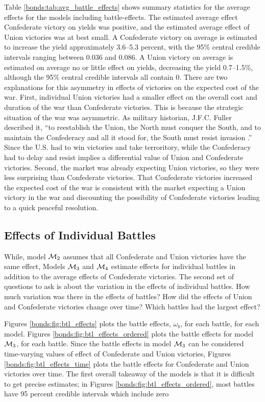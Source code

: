 Table \ref{bonds:tab:avg_battle_effects} shows summary statistics for the average effects for the models including battle-effects.
The estimated average effect Confederate victory on yields was positive, and the estimated average effect of Union victories was at best small.
A Confederate victory on average is estimated to increase the yield approximately 3.6--5.3 percent, with the 95\% central credible intervals ranging between 0.036 and 0.086.
A Union victory on average is estimated on average no or little effect on yields, decreasing the yield 0.7--1.5\%, although the 95\% central credible intervals all contain 0.
There are two explanations for this asymmetry in effects of victories on the expected cost of the war.
First, individual Union victories had a smaller effect on the overall cost and duration of the war than Confederate victories.
This is because the strategic situation of the war was asymmetric. 
As military historian, J.F.C. Fuller described it, ``to reestablish the Union, the North must conquer the South, and to maintain the Confederacy and all it stood for, the South must resist invasion \parencite[177]{Fuller1942a}.'' 
Since the U.S. had to win victories and take terroritory, while the Confederacy had to delay and resist implies a differential value of Union and Confederate victories.
Second, the market was already expecting Union victories, so they were less surprising than Confederate victories.
That Confederate victories increased the expected cost of the war is consistent with the market expecting a Union victory in the war and discounting the possibility of Confederate victories leading to a quick peaceful resolution. 



\subsection{Effects of Individual Battles}
\label{sec:indiv-effects-battl}

While, model $\mathcal{M}_{\text{2}}$ assumes that all Confederate and Union victories have the same effect, Models $\mathcal{M}_{\text{3}}$ and $\mathcal{M}_{\text{4}}$ estimate effects for individual battles in addition to the average effects of Confederate victories.
The second set of questions to ask is about the variation in the effects of individual battles.
How much variation was there in the effects of battles? 
How did the  effects of Union and Confederate victories change over time?
Which battles had the largest effect? 

Figures \ref{bonds:fig:btl_effects} plots the battle effects, $\omega_{b}$, for each battle, for each model.
Figures \ref{bonds:fig:btl_effects_ordered} plots the battle effects for model $\mathcal{M}_{\text{3}}$, for each battle.
Since the battle effects in model $\mathcal{M}_{\text{3}}$ can be considered time-varying values of effect of Confederate and Union victories, Figures \ref{bonds:fig:btl_effects_time} plots the battle effects for Confederate and Union victories over time. 
The first overall takeaway of the models is that it is difficult to get precise estimates; in Figures \ref{bonds:fig:btl_effects_ordered}, most battles have 95 percent credible intervals which include zero

